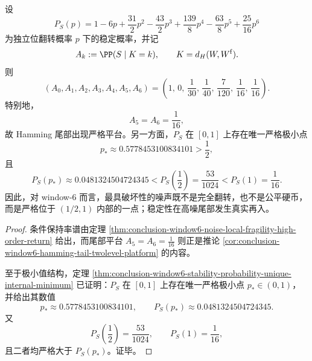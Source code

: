 \begin{theorem}\label{thm:conclusion-window6-superfair-reentrant-minimum}
设
\[
P_S(p)=1-6p+\frac{31}{2}p^2-\frac{43}{2}p^3+\frac{139}{8}p^4-\frac{63}{8}p^5+\frac{25}{16}p^6
\]
为独立位翻转概率 \(p\) 下的稳定概率，并记
\[
A_k:=\PP(S\mid K=k),
\qquad
K=d_H(W,W^{\mathrm f}).
\]
则
\[
(A_0,A_1,A_2,A_3,A_4,A_5,A_6)
=
\left(
1,\,
0,\,
\frac1{30},\,
\frac1{40},\,
\frac7{120},\,
\frac1{16},\,
\frac1{16}
\right).
\]
特别地，
\[
A_5=A_6=\frac1{16},
\]
故 Hamming 尾部出现严格平台。另一方面，\(P_S\) 在 \([0,1]\) 上存在唯一严格极小点
\[
p_*\approx 0.5778453100834101>\frac12,
\]
且
\[
P_S(p_*)\approx 0.0481324504724345
<
P_S\!\left(\frac12\right)=\frac{53}{1024}
<
P_S(1)=\frac1{16}.
\]
因此，对 window-\(6\) 而言，最具破坏性的噪声既不是完全翻转，也不是公平硬币，而是严格位于 \((1/2,1)\) 内部的一点；稳定性在高噪尾部发生真实再入。
\end{theorem}
\begin{proof}
条件保持率谱由定理 \ref{thm:conclusion-window6-noise-local-fragility-high-order-return} 给出，而尾部平台 \(A_5=A_6=\frac1{16}\) 则正是推论 \ref{cor:conclusion-window6-hamming-tail-twolevel-platform} 的内容。

至于极小值结构，定理 \ref{thm:conclusion-window6-stability-probability-unique-internal-minimum} 已证明：\(P_S\) 在 \([0,1]\) 上存在唯一严格极小点 \(p_*\in(0,1)\)，并给出其数值
\[
p_*\approx 0.5778453100834101,
\qquad
P_S(p_*)\approx 0.0481324504724345.
\]
又
\[
P_S\!\left(\frac12\right)=\frac{53}{1024},
\qquad
P_S(1)=\frac1{16},
\]
且二者均严格大于 \(P_S(p_*)\)。证毕。
\end{proof}


